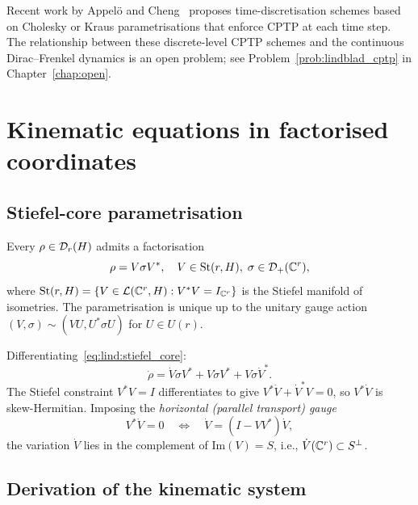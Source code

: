 Recent work by Appelö and Cheng~\cite{AppeloChengo2024} proposes
time-discretisation schemes based on Cholesky or Kraus parametrisations
that enforce CPTP at each time step. The relationship between these
discrete-level CPTP schemes and the continuous Dirac--Frenkel dynamics
is an open problem; see Problem~\ref{prob:lindblad_cptp} in
Chapter~\ref{chap:open}.

\section{Kinematic equations in factorised coordinates}
\label{sec:lind:kinematic}

\subsection*{Stiefel-core parametrisation}

Every $\rho \in \mathcal{D}_{r}(H)$ admits a factorisation
\begin{equation}
\label{eq:lind:stiefel_core}
    \rho = V \sigma V^*,
    \quad V \in \mathrm{St}(r,H),\;
    \sigma \in \mathcal{D}_+(\mathbb{C}^r),
\end{equation}
where $\mathrm{St}(r,H) = \{V \in \mathcal{L}(\mathbb{C}^r, H) : V^*V = I_{\mathbb{C}^r}\}$
is the Stiefel manifold of isometries. The parametrisation is unique up
to the unitary gauge action $(V, \sigma) \sim (VU, U^*\sigma U)$ for
$U \in U(r)$.

Differentiating~\eqref{eq:lind:stiefel_core}:
\begin{equation}
\label{eq:lind:diff_stiefel}
    \dot\rho = \dot{V} \sigma V^* + V \dot\sigma V^* + V \sigma \dot{V}^*.
\end{equation}
The Stiefel constraint $V^*V = I$ differentiates to give $V^*\dot{V} +
\dot{V}^*V = 0$, so $V^*\dot{V}$ is skew-Hermitian. Imposing the
\emph{horizontal (parallel transport) gauge}
\begin{equation}
\label{eq:lind:gauge}
    V^* \dot{V} = 0
    \quad\Longleftrightarrow\quad
    \dot{V} = (I - VV^*) \dot{V},
\end{equation}
the variation $\dot{V}$ lies in the complement of $\mathrm{Im}(V) = S$,
i.e., $\dot{V}(\mathbb{C}^r) \subset S^\perp$.

\subsection*{Derivation of the kinematic system}

